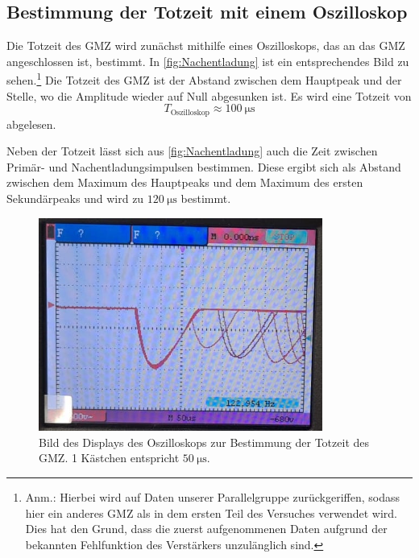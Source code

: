 \subsection{Bestimmung der Totzeit mit einem Oszilloskop}
Die Totzeit des GMZ wird zunächst mithilfe eines Oszilloskops, das an das GMZ angeschlossen ist, bestimmt. In \autoref{fig:Nachentladung} 
ist ein entsprechendes Bild zu sehen.\footnote{Anm.: Hierbei wird auf Daten unserer Parallelgruppe zurückgeriffen, sodass hier ein 
anderes GMZ als in dem ersten Teil des Versuches verwendet wird. Dies hat den Grund, dass die zuerst aufgenommenen Daten aufgrund der bekannten
Fehlfunktion des Verstärkers unzulänglich sind.} Die Totzeit des GMZ ist der Abstand zwischen dem Hauptpeak und der Stelle, wo die Amplitude wieder auf 
Null abgesunken ist. Es wird eine Totzeit von
\begin{equation*}
    T_{\text{Oszilloskop}} \approx \qty{100}{\micro\second}
\end{equation*}
abgelesen.

Neben der Totzeit lässt sich aus \autoref{fig:Nachentladung} auch die Zeit zwischen Primär- und Nachentladungsimpulsen bestimmen. Diese ergibt sich als Abstand
zwischen dem Maximum des Hauptpeaks und dem Maximum des ersten Sekundärpeaks und wird zu $\qty{120}{\micro\second}$ bestimmt.

\begin{figure}[H]
    \centering
    \includegraphics[height=7cm]{content/pics/Nachentladung.jpg}
    \caption{Bild des Displays des Oszilloskops zur Bestimmung der Totzeit des GMZ. 1 Kästchen entspricht $\qty{50}{\micro\second}$.}
    \label{fig:Nachentladung}
\end{figure}

